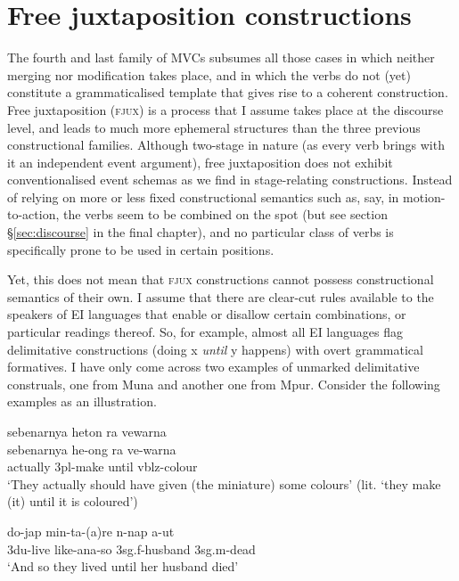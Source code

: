 \section{Free juxtaposition constructions} \label{sec:fjux}

The fourth and last family of MVCs subsumes all those cases in which neither merging nor modification takes place, and in which the verbs do not (yet) constitute a grammaticalised template that gives rise to a coherent construction. Free juxtaposition (\textsc{fjux}) is a process that I assume takes place at the discourse level, and leads to much more ephemeral structures than the three previous constructional families. Although two-stage in nature (as every verb brings with it an independent event argument), free juxtaposition does not exhibit conventionalised event schemas as we find in stage-relating constructions. Instead of relying on more or less fixed constructional semantics such as, say, in motion-to-action, the verbs seem to be combined on the spot (but see section §\ref{sec:discourse} in the final chapter), and no particular class of verbs is specifically prone to be used in certain positions. 

Yet, this does not mean that \textsc{fjux} constructions cannot possess constructional semantics of their own. I assume that there are clear-cut rules available to the speakers of EI languages that enable or disallow certain combinations, or particular readings thereof. So, for example, almost all EI languages flag delimitative constructions (doing x \textit{until} y happens) with overt grammatical formatives. I have only come across two examples of unmarked delimitative construals, one from Muna and another one from Mpur. Consider the following examples as an illustration. 

\ea \label{Wooi_delim}
\gll sebenarnya heton ra vewarna \\
sebenarnya he-ong ra ve-warna \\
\glc actually 3\acs{pl}-make until \acs{vblz}-colour \\
\glft `They actually should have given (the miniature) some colours' (lit. `they make (it) until it is coloured') \\ 
\z
\xe

\ea \label{Mpur_19}
\gll do-jap min-ta-(a)re n-nap a-ut \\
3\acs{du}-live like-\acs{ana}-so 3\acs{sg}.\acs{f}-husband 3\acs{sg}.\acs{m}-dead \\
\glft `And so they lived until her husband died' \\ 
\z
\xe

